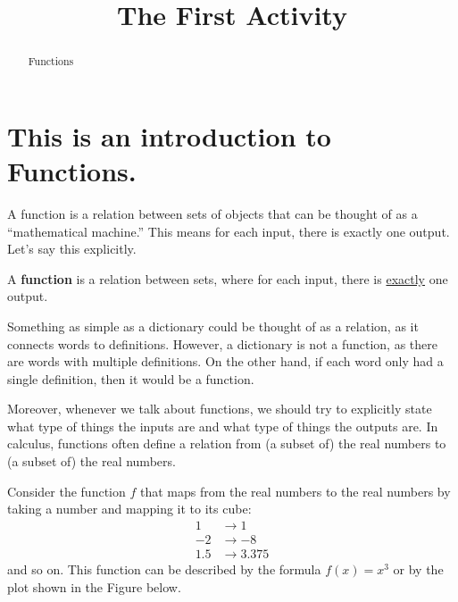 \documentclass{ximera}
\title{The First Activity}
\theoremstyle{definition}
\begin{document}
  
\begin{abstract}  
Functions  
\end{abstract}  
\maketitle  
\section*{This is an introduction to Functions.}  
A function is a relation between sets of objects that can be thought of as a ``mathematical machine.'' This means for each input, there is exactly one output. Let’s say this explicitly.
\begin{definition}
	A \textbf{function} is a relation between sets, where for each input, there is \underline{exactly} one output.
\end{definition}
\begin{remark}
	Something as simple as a dictionary could be thought
	of as a relation, as it connects words to definitions.
	However, a dictionary is not a function, as there
	are words with multiple definitions. On the other
	hand, if each word only had a single definition, then
	it would be a function.
\end{remark}
Moreover, whenever we talk about functions, we should try to explicitly state what type of things the inputs are and what type of things the outputs are. In calculus, functions often define a relation from (a subset of) the real numbers to (a subset of) the real numbers.
\begin{example}
	Consider the function \(f\) that maps from the real numbers to
	the real numbers by taking a number and mapping it to its cube:
\begin{align*}
1&\to 1\\
-2&\to -8\\
1.5&\to 3.375
\end{align*}
and so on. This function can be described by the formula \(f(x)= x^3\) or by the plot shown in the Figure below.
\end{example}
\begin{image}
\end{image}
\end{document}
